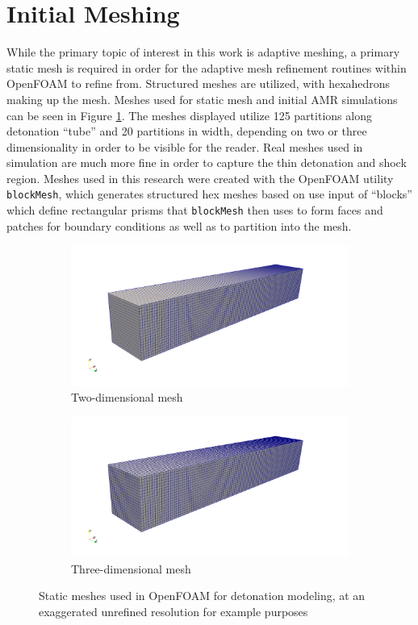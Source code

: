 \section{Initial Meshing}
While the primary topic of interest in this work is adaptive meshing, a primary static mesh is required in order for the adaptive mesh refinement routines within OpenFOAM to refine from. Structured meshes are utilized, with hexahedrons making up the mesh. Meshes used for static mesh and initial AMR simulations can be seen in Figure \ref{fig:meshcompare}. The meshes displayed utilize 125 partitions along detonation ``tube'' and 20 partitions in width, depending on two or three dimensionality in order to be visible for the reader. Real meshes used in simulation are much more fine in order to capture the thin detonation and shock region. Meshes used in this research were created with the OpenFOAM utility \verb|blockMesh|, which generates structured hex meshes based on use input of ``blocks'' which define rectangular prisms that \verb|blockMesh| then uses to form faces and patches for boundary conditions as well as to partition into the mesh. 

\begin{figure}[]
    \centering
    \begin{subfigure}[]{\textwidth}
        \centering
        \includegraphics[width=\textwidth]{./figs/mesh/2Dmesh.png}
        \caption{Two-dimensional mesh}
    \end{subfigure}

    \begin{subfigure}[]{\textwidth}
        \centering
        \includegraphics[width=\textwidth]{./figs/mesh/3Dmesh.png}
        \caption{Three-dimensional mesh}
    \end{subfigure}
    \caption{Static meshes used in OpenFOAM for detonation modeling, at an exaggerated unrefined resolution for example purposes}
    \label{fig:meshcompare}
\end{figure}


